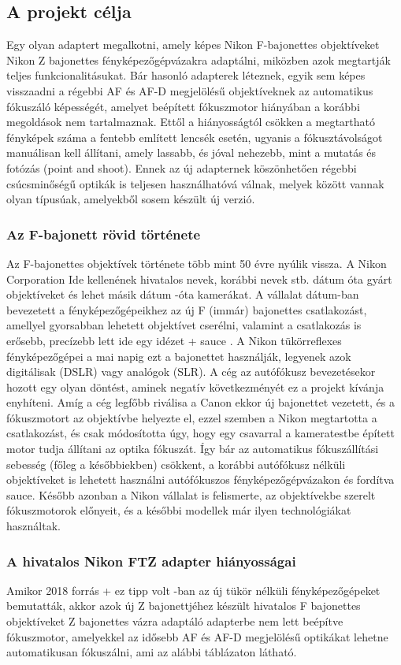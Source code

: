 \subsection{A projekt célja}
Egy olyan adaptert megalkotni, amely képes Nikon F-bajonettes objektíveket Nikon Z bajonettes fényképezőgépvázakra adaptálni, miközben azok megtartják teljes funkcionalitásukat. Bár hasonló adapterek léteznek, egyik sem képes visszaadni a régebbi AF és AF-D megjelölésű objektíveknek az automatikus fókuszáló képességét, amelyet beépített fókuszmotor hiányában a korábbi megoldások nem tartalmaznak. Ettől a hiányosságtól csökken a megtartható fényképek száma a fentebb említett lencsék esetén, ugyanis a fókusztávolságot manuálisan kell állítani, amely lassabb, és jóval nehezebb, mint a mutatás és fotózás (point and shoot). Ennek az új adapternek köszönhetően régebbi csúcsminőségű optikák is teljesen használhatóvá válnak, melyek között vannak olyan típusúak, amelyekből sosem készült új verzió.
\subsubsection{Az F-bajonett rövid története}
Az F-bajonettes objektívek története több mint 50 évre nyúlik vissza. A Nikon Corporation {Ide kellenének hivatalos nevek, korábbi nevek  stb.} {dátum} óta gyárt objektíveket és {lehet másik dátum} {-óta } kamerákat. A vállalat {dátum}-ban bevezetett a fényképezőgépeikhez az új F (immár) bajonettes csatlakozást, amellyel gyorsabban lehetett objektívet cserélni, valamint a csatlakozás is erősebb, precízebb lett {ide egy idézet + sauce }. A Nikon tükörreflexes fényképezőgépei a mai napig ezt a bajonettet használják, legyenek azok digitálisak (DSLR) vagy analógok (SLR). A cég az autófókusz bevezetésekor hozott egy olyan döntést, aminek negatív következményét ez a projekt kívánja enyhíteni. Amíg a cég legfőbb riválisa a Canon ekkor új bajonettet vezetett, és a fókuszmotort az objektívbe helyezte el, ezzel szemben a Nikon megtartotta a csatlakozást, és csak módosította úgy, hogy egy csavarral a kameratestbe épített motor tudja állítani az optika fókuszát. Így bár az automatikus fókuszállítási sebesség (főleg a későbbiekben) csökkent, a korábbi autófókusz nélküli objektíveket is lehetett használni autófókuszos fényképezőgépvázakon és fordítva {sauce}. Később azonban a Nikon vállalat is felismerte, az objektívekbe szerelt fókuszmotorok előnyeit, és a későbbi modellek már ilyen technológiákat használtak.
\subsubsection{A hivatalos Nikon FTZ adapter hiányosságai}
Amikor 2018 {forrás + ez tipp volt} -ban az új tükör nélküli fényképezőgépeket bemutatták, akkor azok új Z bajonettjéhez készült hivatalos F bajonettes objektíveket Z bajonettes vázra adaptáló adapterbe nem lett beépítve fókuszmotor, amelyekkel az idősebb AF és AF-D megjelölésű optikákat lehetne automatikusan fókuszálni, ami az alábbi táblázaton látható.



